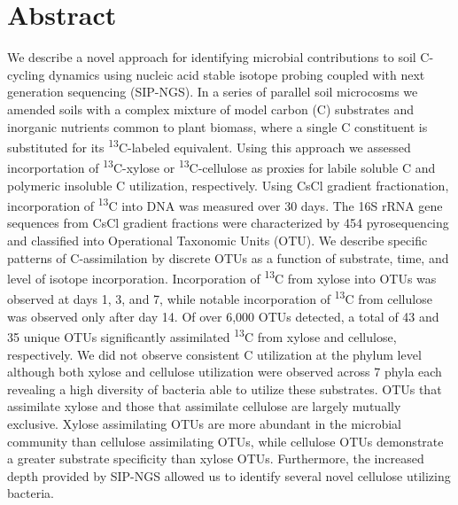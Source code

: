 \section{Abstract}
We describe a novel approach for identifying microbial contributions to soil C-cycling dynamics using nucleic acid stable isotope probing coupled with next generation sequencing (SIP-NGS). In a series of parallel soil microcosms we amended soils with a complex mixture of model carbon (C) substrates and inorganic nutrients common to plant biomass, where a single C constituent is substituted for its \textsuperscript{13}C-labeled equivalent. Using this approach we assessed incorportation of \textsuperscript{13}C-xylose or \textsuperscript{13}C-cellulose as proxies for labile soluble C and polymeric insoluble C utilization, respectively. Using CsCl gradient fractionation, incorporation of \textsuperscript{13}C into DNA was measured over 30 days. The 16S rRNA gene sequences from CsCl gradient fractions were characterized by 454 pyrosequencing and classified into Operational Taxonomic Units (OTU). We describe specific patterns of C-assimilation by discrete OTUs as a function of substrate, time, and level of isotope incorporation. Incorporation of \textsuperscript{13}C from xylose into OTUs was observed at days 1, 3, and 7, while notable incorporation of \textsuperscript{13}C from cellulose was observed only after day 14. Of over 6,000 OTUs detected, a total of 43 and 35 unique OTUs significantly assimilated \textsuperscript{13}C from xylose and cellulose, respectively. We did not observe consistent C utilization at the phylum level although both xylose and cellulose utilization were observed across 7 phyla each revealing a high diversity of bacteria able to utilize these substrates. OTUs that assimilate xylose and those that assimilate cellulose are largely mutually exclusive. Xylose assimilating OTUs are more abundant in the microbial community than cellulose assimilating OTUs, while cellulose OTUs demonstrate a greater substrate specificity than xylose OTUs. Furthermore, the increased depth provided by SIP-NGS allowed us to identify several novel cellulose utilizing bacteria.        

